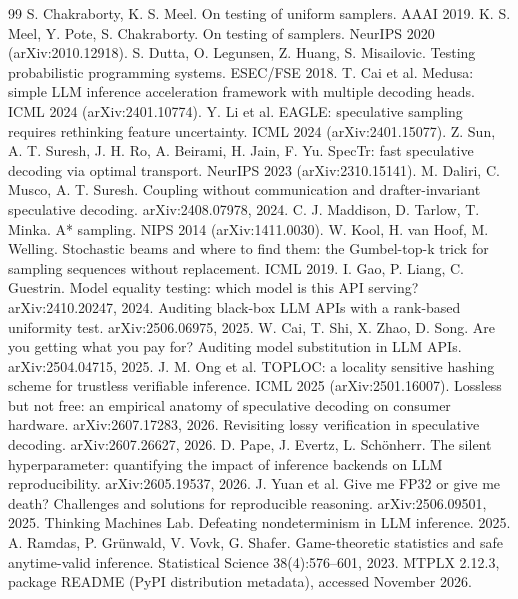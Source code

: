 \documentclass[10pt]{article}
\theoremstyle{remark}
\begin{document}
\begin{thebibliography}{99}
 S. Chakraborty, K. S. Meel. On testing of uniform samplers. AAAI 2019.
 K. S. Meel, Y. Pote, S. Chakraborty. On testing of samplers. NeurIPS 2020 (arXiv:2010.12918).
 S. Dutta, O. Legunsen, Z. Huang, S. Misailovic. Testing probabilistic programming systems. ESEC/FSE 2018.
 T. Cai et al. Medusa: simple LLM inference acceleration framework with multiple decoding heads. ICML 2024 (arXiv:2401.10774).
 Y. Li et al. EAGLE: speculative sampling requires rethinking feature uncertainty. ICML 2024 (arXiv:2401.15077).
 Z. Sun, A. T. Suresh, J. H. Ro, A. Beirami, H. Jain, F. Yu. SpecTr: fast speculative decoding via optimal transport. NeurIPS 2023 (arXiv:2310.15141).
 M. Daliri, C. Musco, A. T. Suresh. Coupling without communication and drafter-invariant speculative decoding. arXiv:2408.07978, 2024.
 C. J. Maddison, D. Tarlow, T. Minka. A* sampling. NIPS 2014 (arXiv:1411.0030).
 W. Kool, H. van Hoof, M. Welling. Stochastic beams and where to find them: the Gumbel-top-k trick for sampling sequences without replacement. ICML 2019.
 I. Gao, P. Liang, C. Guestrin. Model equality testing: which model is this API serving? arXiv:2410.20247, 2024.
 Auditing black-box LLM APIs with a rank-based uniformity test. arXiv:2506.06975, 2025.
 W. Cai, T. Shi, X. Zhao, D. Song. Are you getting what you pay for? Auditing model substitution in LLM APIs. arXiv:2504.04715, 2025.
 J. M. Ong et al. TOPLOC: a locality sensitive hashing scheme for trustless verifiable inference. ICML 2025 (arXiv:2501.16007).
 Lossless but not free: an empirical anatomy of speculative decoding on consumer hardware. arXiv:2607.17283, 2026.
 Revisiting lossy verification in speculative decoding. arXiv:2607.26627, 2026.
 D. Pape, J. Evertz, L. Sch\"onherr. The silent hyperparameter: quantifying the impact of inference backends on LLM reproducibility. arXiv:2605.19537, 2026.
 J. Yuan et al. Give me FP32 or give me death? Challenges and solutions for reproducible reasoning. arXiv:2506.09501, 2025.
 Thinking Machines Lab. Defeating nondeterminism in LLM inference. 2025.
 A. Ramdas, P. Gr\"unwald, V. Vovk, G. Shafer. Game-theoretic statistics and safe anytime-valid inference. Statistical Science 38(4):576--601, 2023.
 MTPLX 2.12.3, package README (PyPI distribution metadata), accessed November 2026.

\end{thebibliography}
\end{document}
